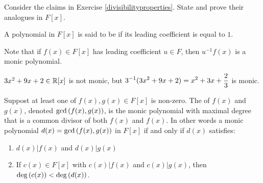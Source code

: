 \documentclass[11pt,fleqn,dvipsnames,usenames]{article}
\newcommand{\p}{\noindent}
\begin{document}
\begin{exercise}
Consider the claims in Exercise \ref{divisibilityproperties}.  State and prove their analogues in $F[x]$.
\end{exercise}
\vsmsp

\terminology A polynomial in $F[x]$ is said to be  if its leading coefficient is equal to $1$.
\vsp

\p Note that if $f(x)\in F[x]$ has leading coefficient $u\in F$, then $u^{-1}f(x)$ is a monic polynomial.
\vsp

\begin{example}
$3x^2 + 9x + 2\in\mathbb{R}[x]$ is not monic, but $\displaystyle{3^{-1}(3x^2 + 9x + 2) = x^2 + 3x + \frac{2}{3}}$ is monic.
\end{example}
%
\begin{definition}
Suppost at least one of $f(x),g(x)\in F[x]$ is non-zero.  The  of $f(x)$ and $g(x)$, denoted $\text{gcd}\left(f(x),g(x)\right)$, is the monic polynomial with maximal degree that is a common divisor of both $f(x)$ and $f(x)$.  In other words a monic polynomial $d(x) = \text{gcd}\left(f(x),g(x)\right)$ in $F[x]$ if and only if $d(x)$ satisfies:
\begin{enumerate}[(1)]
\item $d(x)|f(x)$ and $d(x)|g(x)$
\item If $c(x) \in F[x]$ with $c(x)|f(x)$ and $c(x)|g(x)$, then $\text{deg}\left(c(x)\right) < \text{deg}\left(d(x)\right)$.
\end{enumerate}
\end{definition}
\vsp
\end{document}
